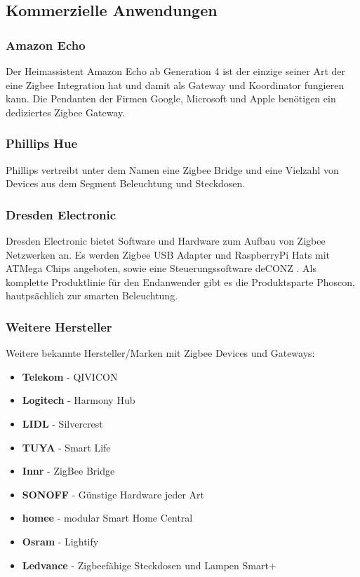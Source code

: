 \subsection{Kommerzielle Anwendungen}

\subsubsection{Amazon Echo}
    Der Heimassistent Amazon Echo ab Generation 4 ist der einzige seiner Art der eine Zigbee Integration hat und damit als Gateway und Koordinator fungieren
    kann. Die Pendanten der Firmen Google, Microsoft und Apple benötigen ein dediziertes Zigbee Gateway.

\subsubsection{Phillips Hue}
    Phillips vertreibt unter dem Namen eine Zigbee Bridge und eine Vielzahl von Devices aus dem Segment Beleuchtung und Steckdosen. 

\subsubsection{Dresden Electronic}
    Dresden Electronic bietet Software und Hardware zum Aufbau von Zigbee Netzwerken an. Es werden Zigbee USB Adapter und RaspberryPi Hats mit ATMega Chips angeboten,
    sowie eine Steuerungssoftware \grqq deCONZ \grqq{}. Als komplette Produktlinie für den Endanwender gibt es die Produktsparte
    \grqq Phoscon\grqq{}, hautpsächlich zur smarten Beleuchtung.

\subsubsection*{Weitere Hersteller}
Weitere bekannte Hersteller/Marken mit Zigbee Devices und Gateways:
\begin{itemize}
    \item \textbf{Telekom} - QIVICON
    \item \textbf{Logitech} - Harmony Hub
    \item \textbf{LIDL} - Silvercrest
    \item \textbf{TUYA} - Smart Life
    \item \textbf{Innr} - ZigBee Bridge
    \item \textbf{SONOFF} - Günstige Hardware jeder Art
    \item \textbf{homee} -  modular Smart Home Central
    \item \textbf{Osram} - Lightify
    \item \textbf{Ledvance} - Zigbeefähige Steckdosen und Lampen \grqq Smart+ \grqq{}
\end{itemize}

